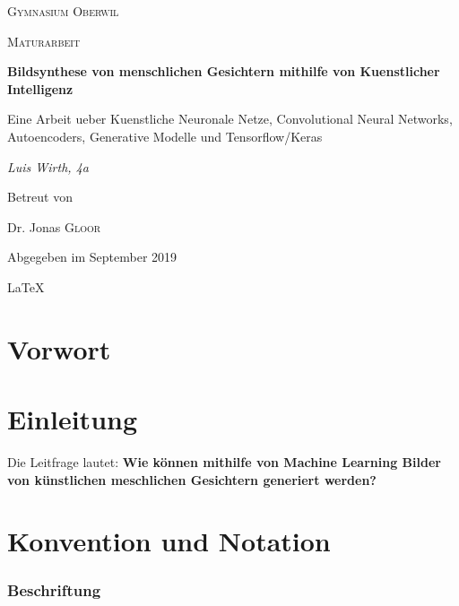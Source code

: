 
\begin{titlepage}
  \centering

  {\scshape\LARGE Gymnasium Oberwil\par}
  \vspace{1cm}
  {\scshape\Large Maturarbeit\par}
  \vspace{1.5cm}
  {\huge\bfseries Bildsynthese von menschlichen Gesichtern mithilfe von Kuenstlicher Intelligenz\par}
  \vspace{0.2cm}
  {\large Eine Arbeit ueber Kuenstliche Neuronale Netze, Convolutional Neural
    Networks, Autoencoders, Generative Modelle und Tensorflow/Keras \par}
  \vspace{2cm}
  {\Large\itshape Luis Wirth, 4a\par}
  \vfill
  Betreut von\par
  Dr. Jonas \textsc{Gloor}

  \vfill
  {\large Abgegeben im September 2019\par}
  \LaTeX{}
\end{titlepage}


\tableofcontents
\pagebreak

\chapter*{Vorwort}
\pagebreak

\chapter*{Einleitung}

Die Leitfrage lautet: \textbf{Wie können mithilfe von Machine Learning Bilder von künstlichen meschlichen Gesichtern generiert werden?}
\pagebreak

\chapter*{Konvention und Notation}

\subsection*{Beschriftung}

